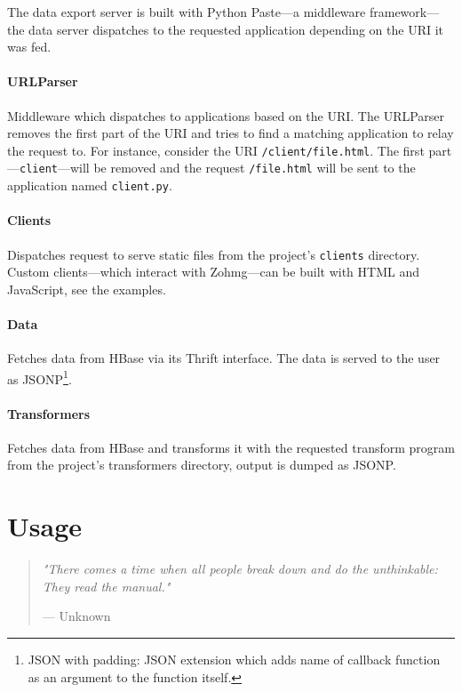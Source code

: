 \documentclass[a4paper,10pt]{book}
\newcommand{\chapterquote}[2] {
\begin{quote}
\textit{"{#1}"}

--- {#2}
\end{quote}

\vspace{24pt}
}
\begin{document}
The data export server is built with Python Paste---a middleware
framework---the data server dispatches to the requested application
depending on the URI it was fed.


\subsubsection{URLParser}

Middleware which dispatches to applications based on the URI. The URLParser
removes the first part of the URI and tries to find a matching application
to relay the request to. For instance, consider the URI
\texttt{/client/file.html}. The first part---\texttt{client}---will be
removed and the request \texttt{/file.html} will be sent to the application
named \texttt{client.py}.


\subsubsection{Clients}

Dispatches request to serve static files from the project's
\texttt{clients} directory. Custom clients---which interact with Zohmg---can
be built with HTML and JavaScript, see the examples.


\subsubsection{Data}

Fetches data from HBase via its Thrift interface. The data is served to the
user as JSONP\footnote{JSON with padding: JSON extension which adds name of
callback function as an argument to the function itself.}.


\subsubsection{Transformers}

Fetches data from HBase and transforms it with the requested transform
program from the project's transformers directory, output is
dumped as JSONP.





\chapter{Usage}

\chapterquote{There comes a time when all people break down and do the
unthinkable: They read the manual.}{Unknown}
\end{document}
